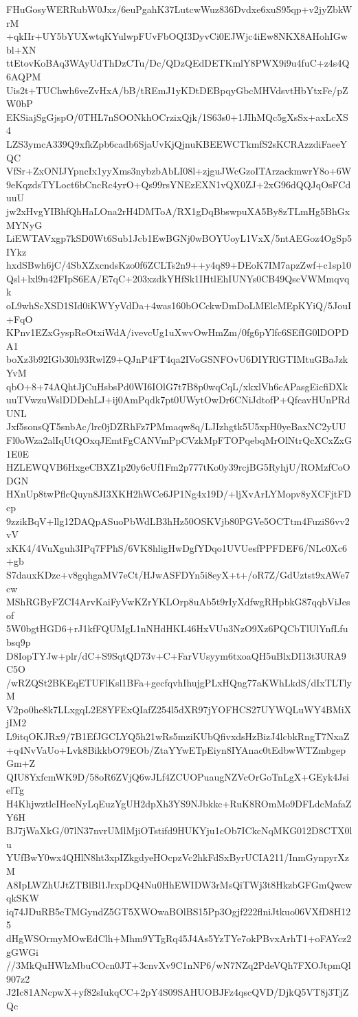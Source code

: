 FHuGosyWERRubW0Jxz/6euPgahK37LutcwWuz836Dvdxe6xuS95qp+v2jyZbkWrM
+qkIIr+UY5bYUXwtqKYulwpFUvFbOQI3DyvCi0EJWjc4iEw8NKX8AHohIGwbl+XN
ttEtovKoBAq3WAyUdThDzCTu/Dc/QDzQEdDETKmlY8PWX9i9u4fuC+z4s4Q6AQPM
Uis2t+TUChwh6veZvHxA/bB/tREmJ1yKDtDEBpqyGbcMHVdsvtHbYtxFe/pZW0bP
EKSiajSgGjspO/0THL7nSOONkhOCrzixQjk/1S63s0+1JIhMQc5gXsSx+axLcXS4
LZS3ymcA339Q9xfkZpb6cadb6SjaUvKjQjnuKBEEWCTkmfS2sKCRAzzdiFaeeYQC
VfSr+ZxONIJYpncIx1yyXms3nybzbAbLI08l+zjguJWcGzoITArzackmwrY8o+6W
9eKqzdsTYLoct6bCncRc4yrO+Qs99rsYNEzEXN1vQX0ZJ+2xG96dQQJqOsFCduuU
jw2xHvgYIBhfQhHaLOna2rH4DMToA/RX1gDqBbswpuXA5By8zTLmHg5BhGxMYNyG
LiEWTAVxgp7kSD0Wt6Sub1Jcb1EwBGNj0wBOYUoyL1VxX/5ntAEGoz4OgSp5IYkz
hxdSBwh6jC/4SbXZxcndsKzo0f6ZCLTs2n9++y4q89+DEoK7IM7apzZwf+c1sp10
Qsl+lxl9n42FIpS6EA/E7qC+203xzdkYHfSk1IHtlEhIUNYs0CB49QscVWMmqvqk
oL9whScXSD1SId0iKWYyVdDa+4was160bOCckwDmDoLMElcMEpKYiQ/5JouI+FqO
KPnv1EZxGyspReOtxiWdA/ivevcUg1uXwvOwHmZm/0fg6pYlfc6SEfIG0lDOPDA1
boXz3b92IGb30h93RwlZ9+QJnP4FT4qa2IVoGSNFOvU6DIYRlGTIMtuGBaJzkYvM
qbO+8+74AQhtJjCuHsbsPd0WI6IOlG7t7B8p0wqCqL/xkxlVh6cAPasgEicfiDXk
uuTVwzuWslDDDehLJ+ij0AmPqdk7pt0UWytOwDr6CNiJdtofP+QfcavHUnPRdUNL
Jxf5sonsQT5snbAc/lrc0jDZRhFz7PMmaqw8q/LJIzhgtk5U5xpH0yeBaxNC2yUU
Fl0oWza2alIqUtQOxqJEmtFgCANVmPpCVzkMpFTOPqebqMrOlNtrQcXCxZxG1E0E
HZLEWQVB6HxgeCBXZ1p20y6cUf1Fm2p777tKo0y39rcjBG5RyhjU/ROMzfCoODGN
HXnUp8twPflcQuyn8JI3XKH2hWCe6JP1Ng4x19D/+ljXvArLYMopv8yXCFjtFDcp
9zzikBqV+llg12DAQpASuoPbWdLB3hHz50OSKVjb80PGVe5OCTtm4FuziS6vv2vV
xKK4/4VuXguh3IPq7FPhS/6VK8hligHwDgfYDqo1UVUesfPPFDEF6/NLc0Xc6+gb
S7dauxKDzc+v8gqhgaMV7eCt/HJwASFDYn5i8eyX+t+/oR7Z/GdUztst9xAWe7cw
MShRGByFZCI4ArvKaiFyVwKZrYKLOrp8uAb5t9rIyXdfwgRHpbkG87qqbViJesof
5W0bgtHGD6+rJ1kfFQUMgL1nNHdHKL46HxVUu3NzO9Xz6PQCbTlUlYnfLfubsq9p
D8IopTYJw+plr/dC+S9SqtQD73v+C+FarVUsyym6txoaQH5uBlxDI13t3URA9C5O
/wRZQSt2BKEqETUFlKsl1BFa+gecfqvhIhujgPLxHQng77aKWhLkdS/dIxTLTlyM
V2po0he8k7LLxgqL2E8YFExQIafZ254l5dXR97jYOFHCS27UYWQLuWY4BMiXjIM2
L9itqOKJRx9/7B1EfJGCLYQ5h21wRs5mziKUbQfivxdsHzBizJ4lcbkRngT7NxaZ
+q4NvVaUo+Lvk8BikkbO79EOb/ZtaYYwETpEiyn8IYAnac0tEdbwWTZmbgepGm+Z
QIU8YxfcmWK9D/58oR6ZVjQ6wJLf4ZCUOPuaugNZVcOrGoTnLgX+GEyk4JsielTg
H4KhjwztlcIHeeNyLqEuzYgUH2dpXh3YS9NJbkkc+RuK8ROmMo9DFLdcMafaZY6H
BJ7jWaXkG/07lN37nvrUMlMjiOTstifd9HUKYju1cOb7ICkcNqMKG012D8CTX0lu
YUfBwY0wx4QHlN8ht3xpIZkgdyeHOcpzVc2hkFdSxByrUCIA211/InmGynpyrXzM
A8IpLWZhUJtZTBlBl1JrxpDQ4Nu0HhEWIDW3rMsQiTWj3t8HkzbGFGmQwcwqkSKW
iq74JDuRB5eTMGyndZ5GT5XWOwaBOlBS15Pp3Ogjf222flniJtkuo06VXfD8H125
dHgWSOrmyMOwEdClh+Mhm9YTgRq45J4As5YzTYe7okPBvxArhT1+oFAYcz2gGWGi
//3MkQuHWlzMbuCOcn0JT+3cnvXv9C1nNP6/wN7NZq2PdeVQh7FXOJtpmQl907z2
J2Ic81ANcpwX+yf82sIukqCC+2pY4S09SAHUOBJFz4qscQVD/DjkQ5VT8j3TjZQc
